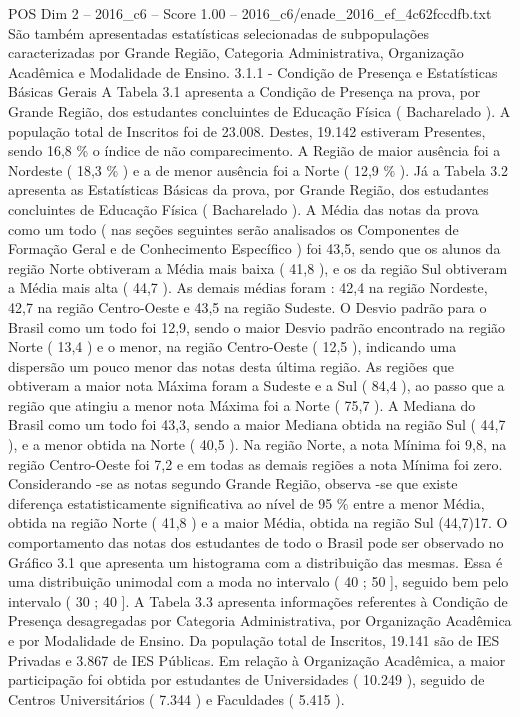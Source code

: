 \begin{textsample}{POS Dim 2 – 2016\_c6 – Score 1.00 – 2016\_c6/enade\_2016\_ef\_4c62fccdfb.txt}
São também apresentadas estatísticas selecionadas de subpopulações caracterizadas por Grande Região, Categoria Administrativa, Organização Acadêmica e Modalidade de Ensino. 3.1.1 - Condição de Presença e Estatísticas Básicas Gerais A Tabela 3.1 apresenta a Condição de Presença na prova, por Grande Região, dos estudantes concluintes de Educação Física ( Bacharelado ).
A população total de Inscritos foi de 23.008.
Destes, 19.142 estiveram Presentes, sendo 16,8 \% o índice de não comparecimento.
A Região de maior ausência foi a Nordeste ( 18,3 \% ) e a de menor ausência foi a Norte ( 12,9 \% ).
Já a Tabela 3.2 apresenta as Estatísticas Básicas da prova, por Grande Região, dos estudantes concluintes de Educação Física ( Bacharelado ).
A Média das notas da prova como um todo ( nas seções seguintes serão analisados os Componentes de Formação Geral e de Conhecimento Específico ) foi 43,5, sendo que os alunos da região Norte obtiveram a Média mais baixa ( 41,8 ), e os da região Sul obtiveram a Média mais alta ( 44,7 ).
As demais médias foram : 42,4 na região Nordeste, 42,7 na região Centro-Oeste e 43,5 na região Sudeste.
O Desvio padrão para o Brasil como um todo foi 12,9, sendo o maior Desvio padrão encontrado na região Norte ( 13,4 ) e o menor, na região Centro-Oeste ( 12,5 ), indicando uma dispersão um pouco menor das notas desta última região.
As regiões que obtiveram a maior nota Máxima foram a Sudeste e a Sul ( 84,4 ), ao passo que a região que atingiu a menor nota Máxima foi a Norte ( 75,7 ).
A Mediana do Brasil como um todo foi 43,3, sendo a maior Mediana obtida na região Sul ( 44,7 ), e a menor obtida na Norte ( 40,5 ).
Na região Norte, a nota Mínima foi 9,8, na região Centro-Oeste foi 7,2 e em todas as demais regiões a nota Mínima foi zero.
Considerando -se as notas segundo Grande Região, observa -se que existe diferença estatisticamente significativa ao nível de 95 \% entre a menor Média, obtida na região Norte ( 41,8 ) e a maior Média, obtida na região Sul (44,7)17.
O comportamento das notas dos estudantes de todo o Brasil pode ser observado no Gráfico 3.1 que apresenta um histograma com a distribuição das mesmas.
Essa é uma distribuição unimodal com a moda no intervalo ( 40 ; 50 ], seguido bem pelo intervalo ( 30 ; 40 ].
A Tabela 3.3 apresenta informações referentes à Condição de Presença desagregadas por Categoria Administrativa, por Organização Acadêmica e por Modalidade de Ensino.
Da população total de Inscritos, 19.141 são de IES Privadas e 3.867 de IES Públicas.
Em relação à Organização Acadêmica, a maior participação foi obtida por estudantes de Universidades ( 10.249 ), seguido de Centros Universitários ( 7.344 ) e Faculdades ( 5.415 ).

\end{textsample}
